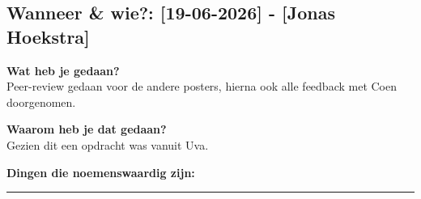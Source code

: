 
\subsection*{Wanneer \& wie?: [19-06-2026] - [Jonas Hoekstra]}

\textbf{Wat heb je gedaan?}\\
Peer-review gedaan voor de andere posters, hierna ook alle feedback met Coen doorgenomen.
\vspace{0.3cm} 

\noindent \textbf{Waarom heb je dat gedaan?}\\
Gezien dit een opdracht was vanuit Uva.

\noindent \textbf{Dingen die noemenswaardig zijn:}\\



\vspace{0.5cm}
\hrule 
\vspace{0.5cm}